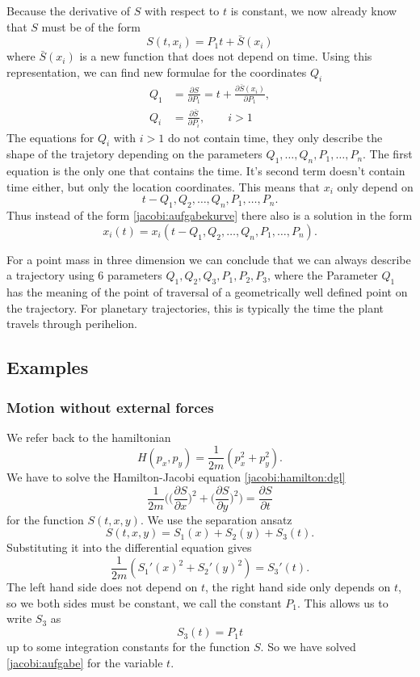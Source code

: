 Because the derivative of $S$ with respect to $t$ is constant, we
now already know that $S$ must be of the form
\[
S(t,x_i)=P_1t + \bar S(x_i)
\]
where $\bar S(x_i)$ is a new function that does not depend on time.
Using this representation, we can find new formulae for the 
coordinates $Q_i$
\begin{align*}
Q_1&=\frac{\partial S}{\partial P_1}=t+\frac{\partial \bar S(x_i)}{\partial P_1},
\\
Q_i&=\frac{\partial \bar S}{\partial P_i},\qquad i>1
\end{align*}
The equations for $Q_i$ with $i>1$ do not contain time,
they only describe the shape of the trajetory depending on the parameters
$Q_1,\dots,Q_n,P_1,\dots,P_n$.
The first equation is the only one that contains the time.
It's second term doesn't contain time either, but only the location
coordinates.
This means that $x_i$ only depend on 
\[
t-Q_1,Q_2,\dots,Q_n, P_1,\dots,P_n.
\]
Thus instead of the form \eqref{jacobi:aufgabekurve} there also is a 
solution in the form
\[
x_i(t)=x_i(t-Q_1,Q_2, \dots,Q_n,P_1,\dots,P_n).
\]

For a point mass in three dimension we can conclude that we can
always describe a trajectory using 6 parameters
$Q_1,Q_2,Q_3,P_1,P_2,P_3$, where the Parameter $Q_1$ has 
the meaning of the point of traversal of a geometrically well defined
point on the trajectory.
For planetary trajectories, this is typically the time the plant
travels through perihelion.

\subsection{Examples}
\subsubsection{Motion without external forces}
We refer back to the hamiltonian
\[
H(p_x, p_y)=\frac1{2m}(p_x^2+p_y^2).
\]
We have to solve the Hamilton-Jacobi equation \eqref{jacobi:hamilton:dgl}
\[
\frac1{2m}\biggl(
\biggl(\frac{\partial S}{\partial x}\biggr)^2
+
\biggl(\frac{\partial S}{\partial y}\biggr)^2
\biggr)=\frac{\partial S}{\partial t}
\]
for the function $S(t,x,y)$.
We use the separation ansatz
\[
S(t,x,y)=S_1(x)+S_2(y) + S_3(t).
\]
Substituting it into the differential equation gives
\begin{equation}
\frac1{2m}( S_1'(x)^2+S_2'(y)^2)=S_3'(t).
\label{jacobi:kraeftefrei:sep1}
\end{equation}
The left hand side does not depend on $t$, the right hand side only
depends on $t$, so we both sides must be constant, we call the
constant $P_1$.
This allows us to write $S_3$  as
\[
S_3(t)=P_1t
\]
up to some integration constants for the function $S$.
So we have solved \eqref{jacobi:aufgabe} for the variable $t$.

